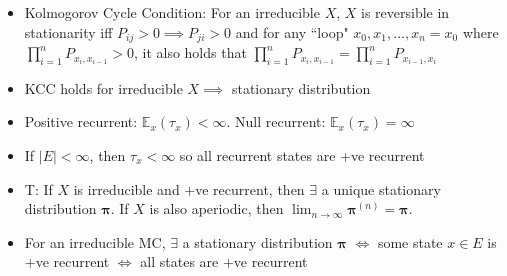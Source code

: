 \begin{itemize}
    \item Kolmogorov Cycle Condition: For an irreducible $X$, $X$ is reversible in stationarity iff $P_{ij} > 0 \implies P_{ji} > 0$ and for any ``loop" $x_0, x_1, \dots, x_n = x_0$ where $\prod_{i=1}^n P_{x_i, x_{i-1}} > 0$, it also holds that $\prod_{i=1}^n P_{x_i, x_{i-1}} = \prod_{i=1}^n P_{x_{i-1}, x_i}$
    \item KCC holds for irreducible $X \implies$ stationary distribution
    \item Positive recurrent: $\mathbb{E}_x(\tau_x) < \infty$. Null recurrent: $\mathbb{E}_x(\tau_x) = \infty$
    \item If $|E| < \infty$, then $\tau_x < \infty$ so all recurrent states are +ve recurrent
    \item T: If $X$ is irreducible and +ve recurrent, then $\exists$ a unique stationary distribution $\boldsymbol{\pi}$. If $X$ is also aperiodic, then $\displaystyle\lim_{n\to\infty}\boldsymbol{\pi}^{(n)} = \boldsymbol{\pi}$.
    \item For an irreducible MC, $\exists$ a stationary distribution $\boldsymbol{\pi}$ $\iff$ some state $x \in E$ is +ve recurrent $\iff$ all states are +ve recurrent
\end{itemize}

